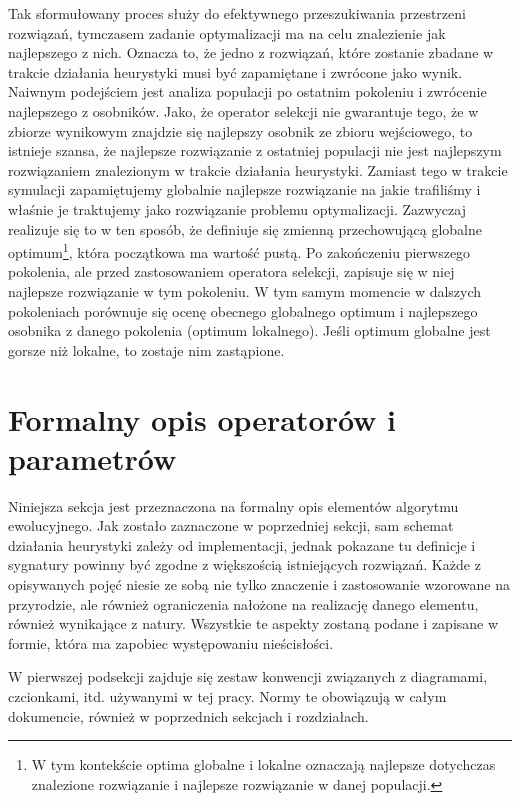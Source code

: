 \documentclass[twoside]{iisthesis}
\begin{document}
Tak sformułowany proces służy do efektywnego przeszukiwania przestrzeni rozwiązań, tymczasem zadanie optymalizacji ma na celu znalezienie jak najlepszego z nich.
Oznacza to, że jedno z rozwiązań, które zostanie zbadane w trakcie działania heurystyki musi być zapamiętane i zwrócone jako wynik. 
Naiwnym podejściem jest analiza populacji po ostatnim pokoleniu i zwrócenie najlepszego z osobników. 
Jako, że operator selekcji nie gwarantuje tego, że w zbiorze wynikowym znajdzie się najlepszy osobnik ze zbioru wejściowego, to istnieje szansa, że najlepsze rozwiązanie z ostatniej populacji nie jest najlepszym rozwiązaniem znalezionym w trakcie działania heurystyki. 
Zamiast tego w trakcie symulacji zapamiętujemy globalnie najlepsze rozwiązanie na jakie trafiliśmy i właśnie je traktujemy jako rozwiązanie problemu optymalizacji.
Zazwyczaj realizuje się to w ten sposób, że definiuje się zmienną przechowującą globalne optimum\footnote{
	W tym kontekście optima globalne i lokalne oznaczają najlepsze dotychczas znalezione rozwiązanie i najlepsze rozwiązanie w danej populacji.
}, która początkowa ma wartość pustą.
Po zakończeniu pierwszego pokolenia, ale przed zastosowaniem operatora selekcji, zapisuje się w niej najlepsze rozwiązanie w tym pokoleniu.
W tym samym momencie w dalszych pokoleniach porównuje się ocenę obecnego globalnego optimum i najlepszego osobnika z danego pokolenia (optimum lokalnego). 
Jeśli optimum globalne jest gorsze niż lokalne, to zostaje nim zastąpione.

\section{Formalny opis operatorów i parametrów}

Niniejsza sekcja jest przeznaczona na formalny opis elementów algorytmu ewolucyjnego.
Jak zostało zaznaczone w poprzedniej sekcji, sam schemat działania heurystyki zależy od implementacji, jednak pokazane tu definicje i sygnatury powinny być zgodne z większością istniejących rozwiązań.
Każde z opisywanych pojęć niesie ze sobą nie tylko znaczenie i zastosowanie wzorowane na przyrodzie, ale również ograniczenia nałożone na realizację danego elementu, również wynikające z natury.
Wszystkie te aspekty zostaną podane i zapisane w formie, która ma zapobiec występowaniu nieścisłości.

W pierwszej podsekcji zajduje się zestaw konwencji związanych z diagramami, czcionkami, itd. używanymi w tej pracy. Normy te obowiązują w całym dokumencie, również w poprzednich sekcjach i rozdziałach.
\end{document}
